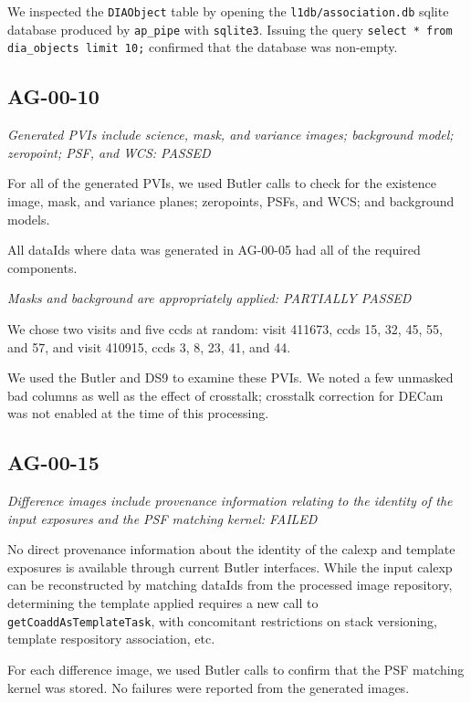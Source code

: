 \documentclass[DM,lsstdraft,STR,toc]{lsstdoc}
\begin{document}
We inspected the \texttt{DIAObject} table by opening the 
\texttt{l1db/association.db} sqlite database produced by \texttt{ap\_pipe} 
with \texttt{sqlite3}.  Issuing the query \texttt{select * from dia\_objects limit 10;} confirmed that the database was non-empty.


\subsection{AG-00-10}

\textit{Generated PVIs include science, mask, and variance images; background model; zeropoint; PSF, and WCS: PASSED}

For all of the generated PVIs, we used Butler calls to check for the existence
image, mask, and variance planes; zeropoints, PSFs, and WCS; and background models.

All dataIds where data was generated in AG-00-05 had all of the required components.

\textit{Masks and background are appropriately applied: PARTIALLY PASSED}

We chose two visits and five ccds at random:
visit 411673, ccds 15, 32, 45, 55, and 57, and
visit 410915, ccds 3,  8, 23, 41, and 44.

We used the Butler and DS9 to examine these PVIs.  We noted a few unmasked 
bad columns as well as the effect of crosstalk; crosstalk correction for DECam
was not enabled at the time of this processing.

\subsection{AG-00-15}

\textit{Difference images include provenance information relating to the 
identity of the input exposures and the PSF matching kernel:  FAILED}

No direct provenance information about the identity of the calexp and template
exposures is available through current Butler interfaces.  While the input
calexp can be reconstructed by matching dataIds from the processed image
repository, determining the template applied requires a new call to
\texttt{getCoaddAsTemplateTask}, with concomitant restrictions on 
stack versioning, template respository association, etc.

For each difference image, we used Butler calls to confirm that the PSF matching kernel was stored.  No failures were reported from the generated images.
\end{document}
